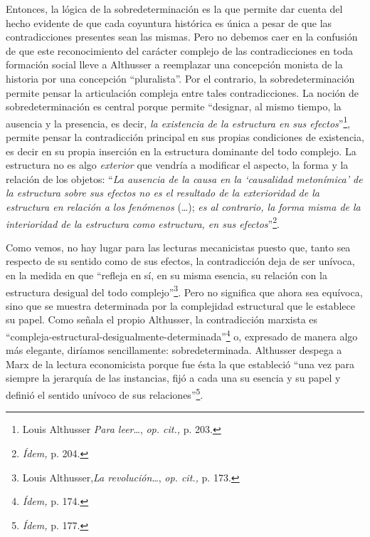 Entonces, la lógica de la sobredeterminación es la que permite dar cuenta del hecho evidente de que cada coyuntura histórica es única a pesar de que las contradicciones presentes sean las mismas. Pero no debemos caer en la confusión de que este reconocimiento del carácter complejo de las contradicciones en toda formación social lleve a Althusser a reemplazar una concepción monista de la historia por una concepción \enquote{pluralista}. Por el contrario, la sobredeterminación permite pensar la articulación compleja entre tales contradicciones. La noción de sobredeterminación es central porque permite \enquote{designar, al mismo tiempo, la ausencia y la presencia, es decir, \emph{la existencia de la estructura en sus efectos}}\footnote{Louis Althusser \emph{Para leer}\ldots, \emph{op. cit.,} p. 203.}, permite pensar la contradicción principal en sus propias condiciones de existencia, es decir en su propia inserción en la estructura dominante del todo complejo. La estructura no es algo \emph{exterior} que vendría a modificar el aspecto, la forma y la relación de los objetos: \enquote{\emph{La ausencia de la causa en la \enquote{causalidad metonímica} de la estructura sobre sus efectos no es el resultado de la exterioridad de la estructura en relación a los fenómenos} (\dots); \emph{es al contrario, la forma misma de la interioridad de la estructura como estructura, en sus efectos}}\footnote{\emph{Ídem,} p. 204.}.

Como vemos, no hay lugar para las lecturas mecanicistas puesto que, tanto sea respecto de su sentido como de sus efectos, la contradicción deja de ser unívoca, en la medida en que \enquote{refleja en sí, en su misma esencia, su relación con la estructura desigual del todo complejo}\footnote{Louis Althusser,\emph{La revolución}\ldots, \emph{op. cit.,} p. 173.}. Pero no significa que ahora sea equívoca, sino que se muestra determinada por la complejidad estructural que le establece su papel. Como señala el propio Althusser, la contradicción marxista es \enquote{compleja-estructural-desigualmente-determinada}\footnote{\emph{Ídem,} p. 174.} o, expresado de manera algo más elegante, diríamos sencillamente: sobredeterminada. Althusser despega a Marx de la lectura economicista porque fue ésta la que estableció \enquote{una vez para siempre la jerarquía de las instancias, fijó a cada una su esencia y su papel y definió el sentido unívoco de sus relaciones}\footnote{\emph{Ídem,} p. 177.}.

